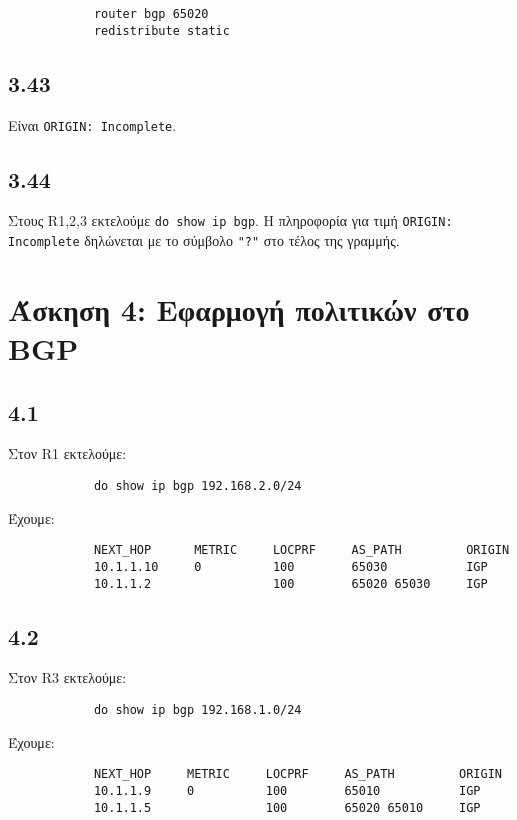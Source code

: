 \documentclass[a4paper, 12pt]{article}
\begin{document}
		\begin{verbatim}
			router bgp 65020
			redistribute static 
		\end{verbatim}

	\subsection*{3.43}
		Είναι \verb|ORIGIN: Incomplete|.

	\subsection*{3.44}
		Στους R1,2,3 εκτελούμε \verb|do show ip bgp|. Η πληροφορία για τιμή \verb|ORIGIN: Incomplete| δηλώνεται με το σύμβολο \verb|"?"| στο τέλος της γραμμής. 

\section*{Άσκηση 4: Εφαρμογή πολιτικών στο BGP}

	\subsection*{4.1}
		Στον R1 εκτελούμε:
		
		\begin{verbatim}
			do show ip bgp 192.168.2.0/24
		\end{verbatim}  
		
		Έχουμε:
		
		\begin{verbatim}
			NEXT_HOP      METRIC     LOCPRF     AS_PATH         ORIGIN
			10.1.1.10     0          100        65030           IGP
			10.1.1.2                 100        65020 65030     IGP
		\end{verbatim}

	\subsection*{4.2}
		Στον R3 εκτελούμε:
		
		\begin{verbatim}
			do show ip bgp 192.168.1.0/24
		\end{verbatim}
		
		Έχουμε:
		
		\begin{verbatim}
			NEXT_HOP     METRIC     LOCPRF     AS_PATH         ORIGIN
			10.1.1.9     0          100        65010           IGP
			10.1.1.5                100        65020 65010     IGP
		\end{verbatim}
		
\end{document}
